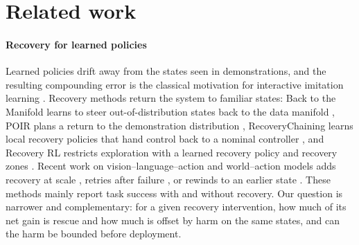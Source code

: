 \section{Related work}\label{sec:related}

\paragraph{Recovery for learned policies}
Learned policies drift away from the states seen in demonstrations, and the resulting compounding error is the classical motivation for interactive imitation learning \cite{ross2011dagger,laskey2017dart}. Recovery methods return the system to familiar states: Back to the Manifold learns to steer out-of-distribution states back to the data manifold \cite{reichlin2022manifold}, POIR plans a return to the demonstration distribution \cite{cideron2023getback}, RecoveryChaining learns local recovery policies that hand control back to a nominal controller \cite{vats2025recoverychaining}, and Recovery RL restricts exploration with a learned recovery policy and recovery zones \cite{thananjeyan2021recoveryrl}. Recent work on vision--language--action and world--action models adds recovery at scale \cite{liufu2026repovla,li2026causalhistory}, retries after failure \cite{du2024toerr}, or rewinds to an earlier state \cite{zheng2026rewind}. These methods mainly report task success with and without recovery. Our question is narrower and complementary: for a given recovery intervention, how much of its net gain is rescue and how much is offset by harm on the same states, and can the harm be bounded before deployment.

